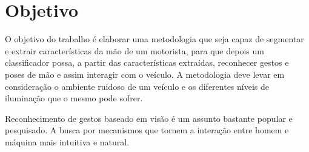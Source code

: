 \chapter{Objetivo}

O objetivo do trabalho é elaborar uma metodologia que seja capaz de segmentar e extrair características da mão de um motorista, para que depois um classificador possa, a partir das características extraídas, reconhecer gestos e poses de mão e assim interagir com o veículo. A metodologia deve levar em consideração o ambiente ruidoso de um veículo e os diferentes níveis de iluminação que o mesmo pode sofrer.

Reconhecimento de gestos baseado em visão é um assunto bastante popular e pesquisado. A busca por mecanismos que tornem a interação entre homem e máquina mais intuitiva e natural.
